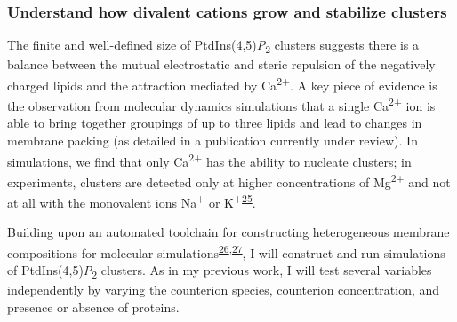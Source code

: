 \documentclass[11pt,notitlepage]{article}
\begin{document}
\hypertarget{understand-how-divalent-cations-grow-and-stabilize-clusters}{%
\subsubsection{Understand how divalent cations grow and stabilize
clusters}\label{understand-how-divalent-cations-grow-and-stabilize-clusters}}

The finite and well-defined size of PtdIns(4,5)\emph{P}\textsubscript{2}
clusters suggests there is a balance between the mutual electrostatic
and steric repulsion of the negatively charged lipids and the attraction
mediated by Ca\textsuperscript{2+}. A key piece of evidence is the
observation from molecular dynamics simulations that a single
Ca\textsuperscript{2+} ion is able to bring together groupings of up to
three lipids and lead to changes in membrane packing (as detailed in a
publication currently under review). In simulations, we find that only
Ca\textsuperscript{2+} has the ability to nucleate clusters; in
experiments, clusters are detected only at higher concentrations of
Mg\textsuperscript{2+} and not at all with the monovalent ions
Na\textsuperscript{+} or
K\textsuperscript{+}\textsuperscript{\protect\hyperlink{ref-JWXdIfNt}{25}}.

Building upon an automated toolchain for constructing heterogeneous
membrane compositions for molecular
simulations\textsuperscript{\protect\hyperlink{ref-14RTQvTQS}{26},\protect\hyperlink{ref-aHkuGDrS}{27}},
I will construct and run simulations of
PtdIns(4,5)\emph{P}\textsubscript{2} clusters. As in my previous work, I
will test several variables independently by varying the counterion
species, counterion concentration, and presence or absence of proteins.
\end{document}
